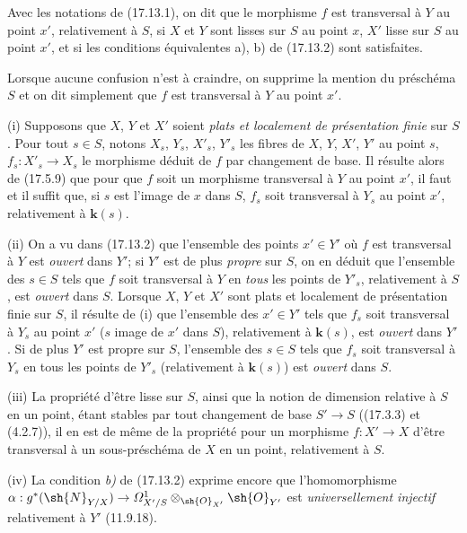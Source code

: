 \begin{definition}[17.13.3]
Avec les notations de \textup{(17.13.1)}, on dit que le morphisme $f$ est transversal à $Y$ au point $x'$, relativement à $S$, si $X$ et $Y$ sont lisses sur $S$ au point $x$, $X'$ lisse sur $S$ au point $x'$, et si les conditions équivalentes \textup{a), b)} de \textup{(17.13.2)} sont satisfaites.
\end{definition}

Lorsque aucune confusion n'est à craindre, on supprime la mention du préschéma $S$ et on dit simplement que $f$ est transversal à $Y$ au point $x'$.

\begin{remarks}[17.13.4]
\label{IV.17.13.4}
(i) Supposons que $X$, $Y$ et $X'$ soient \emph{plats et localement de présentation finie} sur $S$. Pour tout $s\in S$, notons $X_s$, $Y_s$, $X'_s$, $Y'_s$ les fibres de $X$, $Y$, $X'$, $Y'$ au point $s$, $f_s:X'_s\to X_s$ le morphisme déduit de $f$ par changement de base. Il résulte alors de (17.5.9) que pour que $f$ soit un morphisme transversal à $Y$ au point $x'$, il faut et il suffit que, si $s$ est l'image de $x$ dans $S$, $f_s$ soit transversal à $Y_s$ au point $x'$, relativement à $\boldsymbol{k}(s)$.

(ii) On a vu dans (17.13.2) que l'ensemble des points $x'\in Y'$ où $f$ est transversal à $Y$ est \emph{ouvert} dans $Y'$; si $Y'$ est de plus \emph{propre} sur $S$, on en déduit que l'ensemble des $s\in S$ tels que $f$ soit transversal à $Y$ en \emph{tous} les points de $Y'_s$, relativement à $S$, est \emph{ouvert} dans $S$.
Lorsque $X$, $Y$ et $X'$ sont plats et localement de présentation finie sur $S$, il résulte de (i) que l'ensemble des $x'\in Y'$ tels que $f_s$ soit transversal à $Y_s$ au point $x'$ ($s$ image de $x'$ dans $S$), relativement à $\boldsymbol{k}(s)$, est \emph{ouvert} dans $Y'$. Si de plus $Y'$ est propre sur $S$, l'ensemble des $s\in S$ tels que $f_s$ soit transversal à $Y_s$ en tous les points de $Y'_s$ (relativement à $\boldsymbol{k}(s)$) est \emph{ouvert} dans $S$.

(iii) La propriété d'être lisse sur $S$, ainsi que la notion de dimension relative à $S$ en un point, étant stables par tout changement de base $S'\to S$ ((17.3.3) et (4.2.7)), il en est de même de la propriété pour un morphisme $f:X'\to X$ d'être transversal à un sous-préschéma de $X$ en un point, relativement à $S$.


(iv) La condition \emph{b)} de (17.13.2) exprime encore que l'homomorphisme $\alpha:g^*(\sh{N}_{Y/X})\to\varOmega^1_{X'/S}\otimes_{\sh{O}_{X'}}\sh{O}_{Y'}$ est \emph{universellement injectif} relativement à $Y'$ (11.9.18).
\end{remarks}

